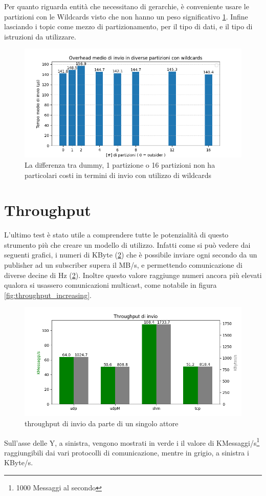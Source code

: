 Per quanto riguarda entità che necessitano di gerarchie, è conveniente usare le partizioni con le Wildcards visto che non hanno un peso significativo \ref{fig:test2wildcards}. Infine lasciando i topic come mezzo di partizionamento, per il tipo di dati, e il tipo di istruzioni da utilizzare.

\begin{figure}[H]
    \centering
    \includegraphics[width=\textwidth]{./results/test2_wildcards.png}
    \caption{La differenza tra dummy, 1 partizione o 16 partizioni non ha particolari costi in termini di invio con utilizzo di wildcards}
        \label{fig:test2wildcards}
\end{figure}



\section{Throughput}
L'ultimo test è stato utile a comprendere tutte le potenzialità di questo strumento più che creare un modello di utilizzo. Infatti come si può vedere dai seguenti grafici, i numeri di KByte (\ref{fig:throughput_combined}) che è possibile inviare ogni secondo da un publisher ad un subscriber supera il MB/s, e permettendo comunicazione di diverse decine di Hz (\ref{fig:throughput_combined}). Inoltre questo valore raggiunge numeri ancora più elevati qualora si usassero comunicazioni multicast, come notabile in figura \ref{fig:throughput_increasing}.
\begin{figure}[H]
    \includegraphics[width=\textwidth]{./results/test3_throughput_combined.png} 
        \caption{throughput di invio da parte di un singolo attore}
        \label{fig:throughput_combined}
\end{figure}
Sull'asse delle Y, a sinistra, vengono mostrati in verde i il valore di KMessaggi/s\footnote{1000 Messaggi al secondo} raggiungibili dai vari protocolli di comunicazione, mentre in grigio, a sinistra i KByte/s.

